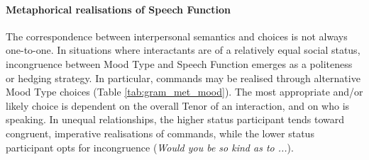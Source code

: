 

\paragraph{Metaphorical realisations of Speech Function}

The correspondence between interpersonal semantics and  choices is not always one\hyp{}to\hyp{}one. In situations where interactants are of a relatively equal social status, incongruence between Mood Type and Speech Function emerges as a politeness or hedging strategy. In particular, commands may be realised through alternative Mood Type choices (Table \ref{tab:gram_met_mood}). The most appropriate and\slash or likely choice is dependent on the overall Tenor of an interaction, and on who is speaking. In unequal relationships, the higher status participant tends toward congruent, imperative realisations of commands, while the lower status participant opts for incongruence (\emph{Would you be so kind as to ...}).

